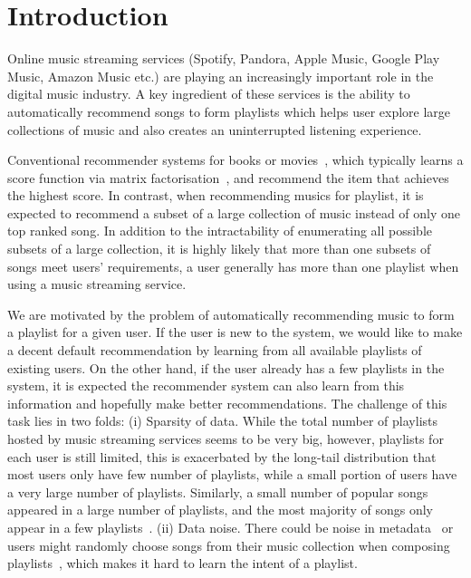 \section{Introduction}
\label{sec:intro}
Online music streaming services (\eg Spotify, Pandora, Apple Music, Google Play Music, Amazon Music etc.) 
are playing an increasingly important role in the digital music industry.
A key ingredient of these services is the ability to automatically recommend songs to form playlists
which helps user explore large collections of music and also creates an uninterrupted listening experience.

Conventional recommender systems for books or movies~\citep{Sarwar:2001,Netflix},
which typically learns a score function via matrix factorisation~\citep{Koren:2009},
and recommend the item that achieves the highest score.
%
In contrast, when recommending musics for playlist, 
it is expected to recommend a subset of a large collection of music instead of only one top ranked song.
In addition to the intractability of enumerating all possible subsets of a large collection,
it is highly likely that more than one subsets of songs meet users' requirements,
\eg a user generally has more than one playlist when using a music streaming service.

We are motivated by the problem of automatically recommending music to form a playlist for a given user.
If the user is new to the system, we would like to make a decent default recommendation by learning from 
all available playlists of existing users.
On the other hand, if the user already has a few playlists in the system, it is expected the recommender 
system can also learn from this information and hopefully make better recommendations.
%
The challenge of this task lies in two folds:
(i) Sparsity of data. While the total number of playlists hosted by music streaming services seems to be very big,
however, playlists for each user is still limited, this is exacerbated by the long-tail distribution that
most users only have few number of playlists, while a small portion of users have a very large number of playlists.
Similarly, a small number of popular songs appeared in a large number of playlists, and the most majority of songs
only appear in a few playlists~\cite{bonnin2013evaluating}.
(ii) Data noise. There could be noise in metadata~\cite{bonnin2015automated} or users might randomly choose songs 
from their music collection when composing playlists~\cite{mcfee2012hypergraph},
which makes it hard to learn the intent of a playlist.

